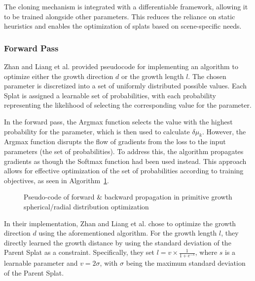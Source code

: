 \documentclass[11pt]{report}
\begin{document}
The cloning mechanism is integrated with a differentiable framework, allowing it to be trained alongside other parameters. This reduces the reliance on static heuristics and enables the optimization of splats based on scene-specific needs.

\subsubsection{Forward Pass}

Zhan and Liang et al. provided pseudocode for implementing an algorithm to optimize either the growth direction $d$ or the growth length $l$. The chosen parameter is discretized into a set of uniformly distributed possible values. Each Splat is assigned a learnable set of probabilities, with each probability representing the likelihood of selecting the corresponding value for the parameter.

In the forward pass, the Argmax function selects the value with the highest probability for the parameter, which is then used to calculate $\delta \mu_k$. However, the Argmax function disrupts the flow of gradients from the loss to the input parameters (the set of probabilities). To address this, the algorithm propagates gradients as though the Softmax function had been used instead. This approach allows for effective optimization of the set of probabilities according to training objectives, as seen in Algorithm~\ref{alg:clone_algo}.

\begin{figure}[htbp] %
    \centering
    \begin{minipage}{0.70\textwidth}
        \begin{algorithm}[H]
        
        \caption{Pseudo-code of forward \& backward propagation in primitive growth spherical/radial distribution optimization}
        \label{alg:clone_algo}
        \end{algorithm}
    \end{minipage}
\end{figure}

In their implementation, Zhan and Liang et al. chose to optimize the growth direction $d$ using the aforementioned algorithm. For the growth length $l$, they directly learned the growth distance by using the standard deviation of the Parent Splat as a constraint. Specifically, they set $l = v \times \frac{1}{1 + e^{-s}}$, where $s$ is a learnable parameter and $v = 2 \sigma$, with $\sigma$ being the maximum standard deviation of the Parent Splat.
\end{document}

